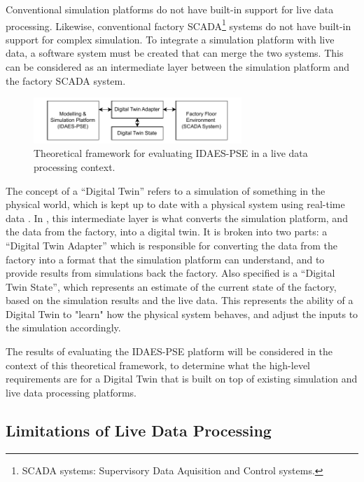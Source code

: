 \documentclass[12pt]{article}
\begin{document}
Conventional simulation platforms do not have built-in support for live data processing. Likewise, conventional factory SCADA\footnote{SCADA systems: Supervisory Data Aquisition and Control systems.} systems do not have built-in support for complex simulation. To integrate a simulation platform with live data, a software system must be created that can merge the two systems. This can be considered as an intermediate layer between the simulation platform and the factory SCADA system.


\begin{figure}[h]
    \centering
    \includegraphics[width=0.7\textwidth]{research_journal_framework_simple.pdf}
    \caption{Theoretical framework for evaluating IDAES-PSE in a live data processing context.}
    \label{fig:theoretical_framework}
\end{figure}

The concept of a “Digital Twin” refers to a simulation of something in the physical world, which is kept up to date with a physical system using real-time data \cite{yu2022energy}.
In , this intermediate layer is what converts the simulation platform, and the data from the factory, into a digital twin. It is broken into two parts: a ``Digital Twin Adapter'' which is responsible for converting the data from the factory into a format that the simulation platform can understand, and to provide results from simulations back the factory. Also specified is a ``Digital Twin State'', which represents an estimate of the current state of the factory, based on the simulation results and the live data. This represents the ability of a Digital Twin to "learn" how the physical system behaves, and adjust the inputs to the simulation accordingly.

The results of evaluating the IDAES-PSE platform will be considered in the context of this theoretical framework, to determine what the high-level requirements are for a Digital Twin that is built on top of existing simulation and live data processing platforms.

\subsection{Limitations of Live Data Processing} \label{sec:limitations_framework}
\end{document}
